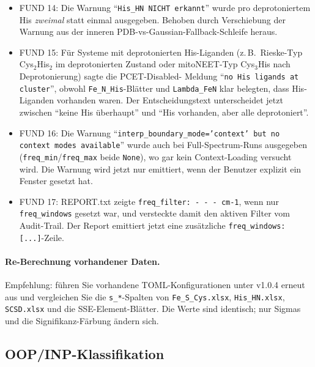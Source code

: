 \documentclass[11pt,a4paper,twoside]{article}
\theoremstyle{remark}
\begin{document}
\begin{itemize}\setlength{\itemsep}{2pt}
  \item FUND 14: Die Warnung
        ``\texttt{His\_HN NICHT erkannt}'' wurde pro deprotoniertem
        His \emph{zweimal} statt einmal ausgegeben. Behoben durch
        Verschiebung der Warnung aus der inneren
        PDB-vs-Gaussian-Fallback-Schleife heraus.
  \item FUND 15: F\"ur Systeme mit deprotonierten His-Liganden
        (z.\,B.\ Rieske-Typ Cys$_2$His$_2$ im deprotonierten
        Zustand oder mitoNEET-Typ Cys$_3$His nach Deprotonierung) sagte die PCET-Disabled-
        Meldung ``\texttt{no His ligands at cluster}'', obwohl
        \texttt{Fe\_N\_His}-Bl\"atter und \texttt{Lambda\_FeN}
        klar belegten, dass His-Liganden vorhanden waren. Der
        Entscheidungstext unterscheidet jetzt zwischen ``keine His
        \"uberhaupt'' und ``His vorhanden, aber alle deprotoniert''.
  \item FUND 16: Die Warnung
        ``\texttt{interp\_boundary\_mode='context' but no context
        modes available}'' wurde auch bei Full-Spectrum-Runs
        ausgegeben (\texttt{freq\_min}/\texttt{freq\_max} beide
        \texttt{None}), wo gar kein Context-Loading versucht wird.
        Die Warnung wird jetzt nur emittiert, wenn der Benutzer
        explizit ein Fenster gesetzt hat.
  \item FUND 17: REPORT.txt zeigte \texttt{freq\_filter: - - -
        cm-1}, wenn nur \texttt{freq\_windows} gesetzt war, und
        versteckte damit den aktiven Filter vom Audit-Trail. Der
        Report emittiert jetzt eine zus\"atzliche
        \texttt{freq\_windows: [...]}-Zeile.
\end{itemize}

\paragraph{Re-Berechnung vorhandener Daten.} Empfehlung: f\"uhren Sie
vorhandene TOML-Konfigurationen unter v1.0.4 erneut aus und
vergleichen Sie die \texttt{s\_*}-Spalten von
\texttt{Fe\_S\_Cys.xlsx}, \texttt{His\_HN.xlsx}, \texttt{SCSD.xlsx}
und die SSE-Element-Bl\"atter. Die Werte sind identisch; nur Sigmas
und die Signifikanz-F\"arbung \"andern sich.

\subsection{OOP/INP-Klassifikation}
\label{sec:oop-inp}
\end{document}
